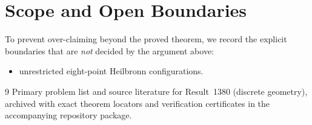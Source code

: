 \documentclass[10pt,reqno]{amsart}
\theoremstyle{definition}
\begin{document}
\section{Scope and Open Boundaries}

To prevent over-claiming beyond the proved theorem, we record the explicit boundaries that are \emph{not} decided by the argument above:
\begin{itemize}
  \item unrestricted eight-point Heilbronn configurations.
\end{itemize}

\begin{thebibliography}{9}
Primary problem list and source literature for Result~1380 (discrete geometry), archived with exact theorem locators and verification certificates in the accompanying repository package.
\end{thebibliography}
\end{document}
